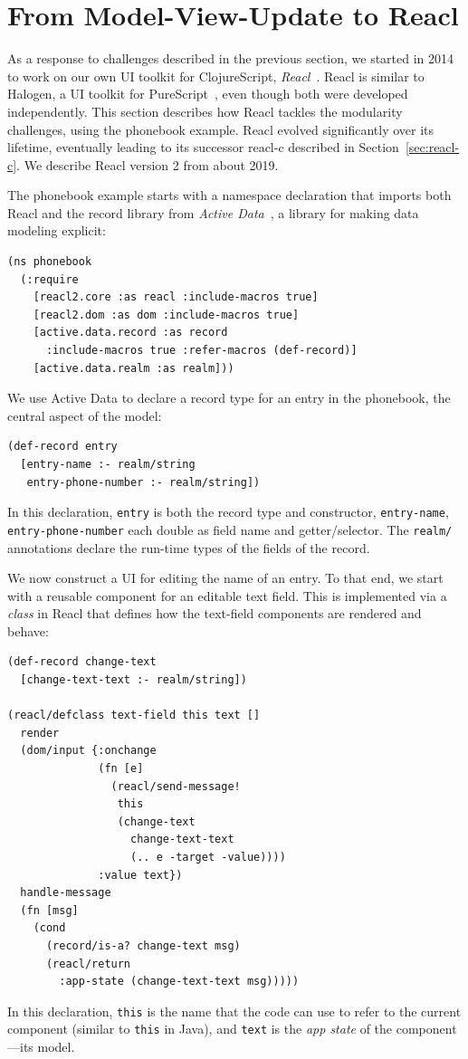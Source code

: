\documentclass[sigplan,review,screen]{acmart}
\begin{document}
\section{From Model-View-Update to Reacl}
\label{sec:reacl}

As a response to challenges described in the previous section, we
started in 2014 to work on our own UI toolkit for ClojureScript,
\textit{Reacl}~\cite{Reacl}.  Reacl is similar to Halogen, a UI
toolkit for PureScript~\cite{Halogen}, even though both were developed
independently.
This section describes how Reacl tackles
the modularity challenges, using the phonebook example.  Reacl evolved
significantly over its lifetime, eventually leading to its successor
reacl-c described in Section~\ref{sec:reacl-c}.  We describe Reacl version 2
from about 2019.

The phonebook example starts with a namespace declaration that imports
both Reacl and the record library from \textit{Active
  Data}~\cite{ActiveData}, a library for making data modeling
explicit:
%
\begin{verbatim}
(ns phonebook
  (:require
    [reacl2.core :as reacl :include-macros true]
    [reacl2.dom :as dom :include-macros true]
    [active.data.record :as record
      :include-macros true :refer-macros (def-record)]
    [active.data.realm :as realm]))
\end{verbatim}
%
We use Active Data to declare a record type for an entry in the
phonebook, the central aspect of the model:
%
\begin{verbatim}
(def-record entry
  [entry-name :- realm/string
   entry-phone-number :- realm/string])
\end{verbatim}
%
In this declaration, \texttt{entry} is both the record type and
constructor, \texttt{entry-name},
\texttt{entry-phone-number} each double as field name and
getter/selector.  The \texttt{realm/} annotations declare the run-time
types of the fields of the record.

We now construct a UI for editing the name of an entry.  To that end,
we start with a reusable component for an editable text field.  This
is implemented via a \textit{class} in Reacl that defines how the
text-field components are rendered and behave:
%
\begin{verbatim}
(def-record change-text
  [change-text-text :- realm/string])

(reacl/defclass text-field this text []
  render
  (dom/input {:onchange 
              (fn [e]
                (reacl/send-message!
                 this
                 (change-text
                   change-text-text
                   (.. e -target -value))))
              :value text})
  handle-message
  (fn [msg]
    (cond
      (record/is-a? change-text msg)
      (reacl/return
        :app-state (change-text-text msg)))))
\end{verbatim}
%
In this declaration, \texttt{this} is the name that the code can use
to refer to the current component (similar to \texttt{this} in Java),
and \texttt{text} is the \textit{app state} of the component---its
model.
\end{document}
